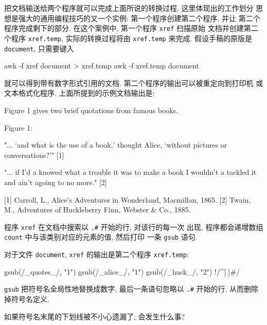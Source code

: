 把文档输送给两个程序就可以完成上面所说的转换过程. 这里体现出的工作划分
思想是强大的通用编程技巧的又一个实例: 第一个程序创建第二个程序, 并让
第二个程序完成剩下的部分. 在这个案例中, 第一个程序 \texttt{xref} 扫描原始
文档并创建第二个程序 \texttt{xref.temp}, 实际的转换过程将由
\texttt{xref.temp} 来完成. 假设手稿的原版是 \texttt{document}, 只需要键入
\begin{shell}
    awk -f xref document > xref.temp
    awk -f xref.temp document
\end{shell}
就可以得到带有数字形式引用的文档. 第二个程序的输出可以被重定向到打印机
或文本格式化程序.
上面所提到的示例文档输出是:
\begin{file}
    Figure 1 gives two brief quotations from famous books.

                            Figure 1:

      "... `and what is the use of a book,' thought Alice,
      `without pictures or conversations?'" [1]

      "... if I'd a knowed what a trouble it was to make a book
      I wouldn't a tackled it and ain't agoing to no more." [2]


    [1] Carroll, L., Alice's Adventures in Wonderland,
        Macmillan, 1865.
    [2] Twain, M., Adventures of Huckleberry Finn,
        Webster & Co., 1885.
\end{file}

程序 \texttt{xref} 在文档中搜索以 \texttt{.\#} 开始的行, 对该行的每一次
出现, 程序都会递增数组 \texttt{count} 中与该类别对应的元素的值, 然后打印
一条 \texttt{gsub} 语句.
对于文件 \texttt{document}, \texttt{xref} 的输出是第二个程序
\texttt{xref.temp}:
\begin{awkcode}
    { gsub(/_quotes_/, "1") }
    { gsub(/_alice_/, "1") }
    { gsub(/_huck_/, "2") }
    !/^[.]#/
\end{awkcode}
\texttt{gsub} 把符号名全局性地替换成数字, 最后一条语句忽略以 \texttt{.\#}
开始的行, 从而删除掉符号名定义.

\begin{exercise}
    如果符号名末尾的下划线被不小心遗漏了, 会发生什么事?
\end{exercise}

